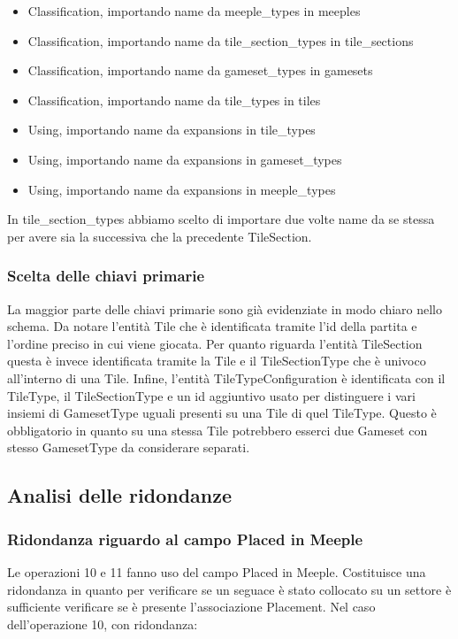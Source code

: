 \begin{itemize}
    \item Classification, importando name da meeple\_types in meeples
    \item Classification, importando name da tile\_section\_types in tile\_sections
    \item Classification, importando name da gameset\_types in gamesets
    \item Classification, importando name da tile\_types in tiles
    \item Using, importando name da expansions in tile\_types
    \item Using, importando name da expansions in gameset\_types
    \item Using, importando name da expansions in meeple\_types
\end{itemize}
In tile\_section\_types abbiamo scelto di importare due volte name da se stessa per avere sia la successiva che la precedente TileSection.

\medskip
\subsubsection*{Scelta delle chiavi primarie}
La maggior parte delle chiavi primarie sono già evidenziate in modo chiaro nello schema. Da notare l'entità Tile che è identificata tramite l'id della partita e l'ordine preciso in cui viene giocata. Per quanto riguarda l'entità TileSection questa è invece identificata tramite la Tile e il TileSectionType che è univoco all'interno di una Tile. Infine, l'entità TileTypeConfiguration è identificata con il TileType, il TileSectionType e un id aggiuntivo usato per distinguere i vari insiemi di GamesetType uguali presenti su una Tile di quel TileType. Questo è obbligatorio in quanto su una stessa Tile potrebbero esserci due Gameset con stesso GamesetType da considerare separati.

\subsection{Analisi delle ridondanze}

\subsubsection*{Ridondanza riguardo al campo Placed in Meeple}
Le operazioni 10 e 11 fanno uso del campo Placed in Meeple. Costituisce una ridondanza in quanto per verificare se un seguace è stato collocato su un settore è sufficiente verificare se è presente l'associazione Placement. Nel caso dell'operazione 10, con ridondanza:

